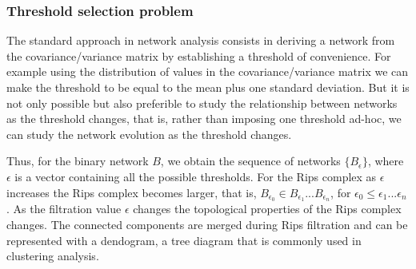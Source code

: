 \documentclass[onecollarge,runningheads]{svjour2}
\begin{document}
\subsubsection{Threshold selection problem}
\label{sse:thr}

The standard approach in network analysis consists in deriving a network from the covariance/variance matrix by establishing a threshold of convenience. For example using the distribution of values in the covariance/variance matrix we can make the threshold to be equal to the mean plus one  standard deviation. But it is not only possible but also preferible to study the relationship between networks as the threshold changes, that is, rather than imposing one threshold ad-hoc, we can study the network evolution as the threshold changes.



Thus, for the binary network $B$, we obtain the sequence of networks $\{B_{\epsilon}\}$, where $\epsilon$ is a vector containing all the possible thresholds. For the Rips complex as $\epsilon$ increases the Rips complex becomes larger, that is, $B_{\epsilon_0} \in B_{\epsilon_1} ... B_{\epsilon_n}$, for $\epsilon_0 \leq \epsilon_1 ...\epsilon_n$. As the filtration value $\epsilon$ changes the topological properties of the Rips complex changes.
The connected components are merged during Rips filtration and can be represented with a dendogram, a tree diagram that is commonly used in clustering analysis.
\end{document}
